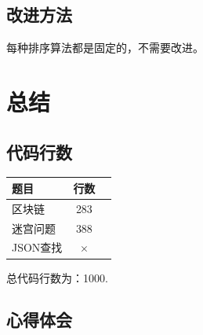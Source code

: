 \documentclass[a4paper,11pt,UTF8]{ctexart}
\begin{document}
\subsection{改进方法}

每种排序算法都是固定的，不需要改进。

\section{总结}
\subsection{代码行数}
\begin{table}[!h!tbp]
    \centering
  \begin{tabular*}{0.75\textwidth}{@{\extracolsep{\fill}}lcc}
      \toprule
      题目          &行数         \\
      \midrule
      区块链         &283     \\
      迷宫问题       &388     \\
      JSON查找      &$\times$    \\
      \bottomrule
  \end{tabular*}
  \end{table}
  总代码行数为：1000.
\subsection{心得体会}

\setlength{\parskip}{6pt}  %
\vspace{4cm}
\end{document}
